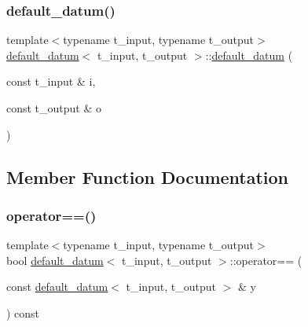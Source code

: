 \mbox{\label{classdefault__datum_aab82d7d96c8fdcecc36b554b83a5e5e2}} 
\subsubsection{\texorpdfstring{default\+\_\+datum()}{default\_datum()}\hspace{0.1cm}{\footnotesize\ttfamily [3/3]}}
{\footnotesize\ttfamily template$<$typename t\+\_\+input, typename t\+\_\+output$>$ \\
\hyperlink{classdefault__datum}{default\+\_\+datum}$<$ t\+\_\+input, t\+\_\+output $>$\+::\hyperlink{classdefault__datum}{default\+\_\+datum} (\begin{DoxyParamCaption}\item[{const t\+\_\+input \&}]{i,  }\item[{const t\+\_\+output \&}]{o }\end{DoxyParamCaption})\hspace{0.3cm}{\ttfamily [inline]}}



\subsection{Member Function Documentation}
\mbox{\label{classdefault__datum_a1da1cd62c4b98771b010d5b625c2f744}} 
\subsubsection{\texorpdfstring{operator==()}{operator==()}}
{\footnotesize\ttfamily template$<$typename t\+\_\+input, typename t\+\_\+output$>$ \\
bool \hyperlink{classdefault__datum}{default\+\_\+datum}$<$ t\+\_\+input, t\+\_\+output $>$\+::operator== (\begin{DoxyParamCaption}\item[{const \hyperlink{classdefault__datum}{default\+\_\+datum}$<$ t\+\_\+input, t\+\_\+output $>$ \&}]{y }\end{DoxyParamCaption}) const\hspace{0.3cm}{\ttfamily [inline]}}



